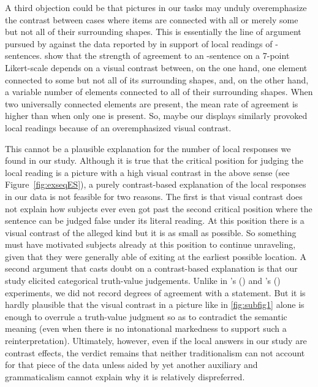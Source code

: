 \documentclass[fleqn,reqno,10pt,draft]{article}
\renewcommand{\es}{\acro{es}}
\begin{document}
A third objection could be that pictures in our tasks may unduly
overemphasize the contrast between cases where items are connected
with all or merely some but not all of their surrounding shapes. This
is essentially the line of argument pursued by
\citet{GeurtsTielvan-Tiel2013:Scalar-expressi} against the data
reported by \citet{ChemlaSpector2010:Experimental-Ev} in support of
local readings of
\es-sentences. \citeauthor{GeurtsTielvan-Tiel2013:Scalar-expressi}
show that the strength of agreement to an \es-sentence on a 7-point
Likert-scale depends on a visual contrast between, on the one hand,
one element connected to some but not all of its surrounding shapes,
and, on the other hand, a variable number of elements connected to all
of their surrounding shapes. When two universally connected elements
are present, the mean rate of agreement is higher than when only one
is present. So, maybe our displays similarly provoked local readings
because of an overemphasized visual contrast.

This cannot be a plausible explanation for the number of local
responses we found in our study. Although it is true that the critical
position for judging the local reading is a picture with a high visual
contrast in the above sense (see Figure~\ref{fig:exseqES}), a purely
contrast-based explanation of the local responses in our data is not
feasible for two reasons. The first is that visual contrast does not
explain how subjects ever even got past the second critical position
where the sentence can be judged false under its literal reading. At
this position there is a visual contrast of the alleged kind but it is
as small as possible. So something must have motivated subjects
already at this position to continue unraveling, given that they were
generally able of exiting at the earliest possible location. A second
argument that casts doubt on a contrast-based explanation is that our
study elicited categorical truth-value judgements. Unlike in
\citeauthor{ChemlaSpector2010:Experimental-Ev}'s
(\citeyear{ChemlaSpector2010:Experimental-Ev}) and
\citeauthor{GeurtsTielvan-Tiel2013:Scalar-expressi}'s
(\citeyear{GeurtsTielvan-Tiel2013:Scalar-expressi}) experiments, we
did not record degrees of agreement with a statement. But it is hardly
plausible that the visual contrast in a picture like in
\ref{fig:subfig1} alone is enough to overrule a truth-value judgment
so as to contradict the semantic meaning (even when there is no
intonational markedness to support such a
reinterpretation). Ultimately, however, even if the local answers in
our study are contrast effects, the verdict remains that neither
traditionalism can not account for that piece of the data unless aided
by yet another auxiliary and grammaticalism cannot explain why it is
relatively dispreferred.
\end{document}

